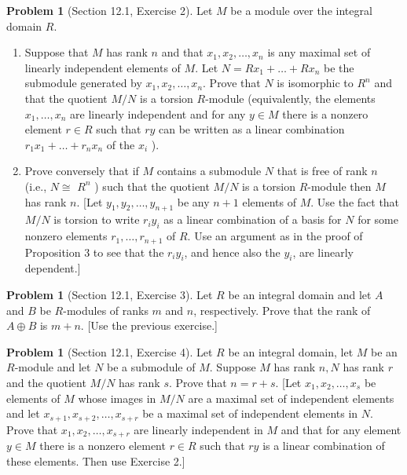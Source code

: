 \documentclass{amsart}
\numberwithin{equation}{section}
\theoremstyle{definition}
\newtheorem{problem}[thm]{Problem}
\begin{document}
\begin{problem}[Section 12.1, Exercise 2]
 Let \(M\) be a module over the integral domain \(R\).
 \begin{enumerate}
 \item Suppose that \(M\) has rank \(n\) and that \(x_1, x_2, \ldots, x_n\) is any maximal set of linearly independent elements of \(M\). Let \(N=R x_1+\ldots+R x_n\) be the submodule generated by \(x_1, x_2, \ldots, x_n\). Prove that \(N\) is isomorphic to \(R^n\) and that the quotient \(M / N\) is a torsion \(R\)-module (equivalently, the elements \(x_1, \ldots, x_n\) are linearly independent and for any \(y \in M\) there is a nonzero element \(r \in R\) such that \(r y\) can be written as a linear combination \(r_1 x_1+\ldots+r_n x_n\) of the \(x_i\) ).
\item Prove conversely that if \(M\) contains a submodule \(N\) that is free of rank \(n\) (i.e., \(N \cong\) \(R^n\) ) such that the quotient \(M / N\) is a torsion \(R\)-module then \(M\) has rank \(n\). [Let \(y_1, y_2, \ldots, y_{n+1}\) be any \(n+1\) elements of \(M\). Use the fact that \(M / N\) is torsion to write \(r_i y_i\) as a linear combination of a basis for \(N\) for some nonzero elements \(r_1, \ldots, r_{n+1}\) of \(R\). Use an argument as in the proof of Proposition 3 to see that the \(r_i y_i\), and hence also the \(y_i\), are linearly dependent.] 
 \end{enumerate}
\end{problem}

\begin{problem}[Section 12.1, Exercise 3]
 Let \(R\) be an integral domain and let \(A\) and \(B\) be \(R\)-modules of ranks \(m\) and \(n\), respectively. Prove that the rank of \(A \oplus B\) is \(m+n\). [Use the previous exercise.] 
\end{problem}


\begin{problem}[Section 12.1, Exercise 4]
Let \(R\) be an integral domain, let \(M\) be an \(R\)-module and let \(N\) be a submodule of \(M\). Suppose \(M\) has rank \(n, N\) has rank \(r\) and the quotient \(M / N\) has rank \(s\). Prove that \(n=r+s\). [Let \(x_1, x_2, \ldots, x_s\) be elements of \(M\) whose images in \(M / N\) are a maximal set of independent elements and let \(x_{s+1}, x_{s+2}, \ldots, x_{s+r}\) be a maximal set of independent elements in \(N\). Prove that \(x_1, x_2, \ldots, x_{s+r}\) are linearly independent in \(M\) and that for any element \(y \in M\) there is a nonzero element \(r \in R\) such that \(r y\) is a linear combination of these elements. Then use Exercise 2.]  
\end{problem}
\end{document}
